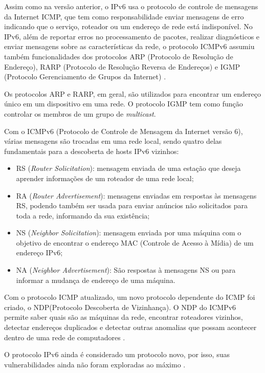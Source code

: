 Assim como na versão anterior, o IPv6 usa o protocolo de controle de mensagens da Internet ICMP, que tem como responsabilidade enviar mensagens de erro indicando que o serviço, roteador ou um endereço de rede está indisponível. No IPv6, além de reportar erros no processamento de pacotes, realizar diagnósticos e enviar mensagens sobre as características da rede, o protocolo ICMPv6 assumiu também funcionalidades dos protocolos ARP (Protocolo de Resolução de Endereço), RARP (Protocolo de Resolução Reversa de Endereços) e IGMP (Protocolo Gerenciamento de Grupos da Internet) \cite{teleco}. 

Os protocolos ARP e RARP, em geral, são utilizados para encontrar um endereço único em um dispositivo em uma rede. O protocolo IGMP tem como função controlar os membros de um grupo de \textit{multicast}.

Com o ICMPv6 (Protocolo de Controle de Mensagem da Internet versão 6), várias mensagens são trocadas em uma rede local, sendo quatro delas fundamentais para a descoberta de hosts IPv6 vizinhos:

\begin{itemize}
\item RS (\textit{Router Solicitation}): mensagem enviada de uma estação que deseja aprender informações de um roteador de uma rede local;
\item RA (\textit{Router Advertisement}): mensagens enviadas em respostas às mensagens RS, podendo também ser usada para enviar anúncios não solicitados para toda a rede, informando da sua existência;
\item NS (\textit{Neighbor Solicitation}): mensagem enviada por uma máquina com o objetivo de encontrar o endereço MAC (Controle de Acesso à Mídia) de um endereço IPv6;
\item NA (\textit{Neighbor Advertisement}): São respostas à mensagens NS ou para informar a mudança de endereço de uma máquina.
\end{itemize}

Com o protocolo ICMP atualizado, um novo protocolo dependente do ICMP foi criado, o NDP(Protocolo Descoberta de Vizinhança). O NDP do ICMPv6 permite saber quais são as máquinas da rede, encontrar roteadores vizinhos, detectar endereços duplicados e detectar outras anomalias que possam acontecer dentro de uma rede de computadores \cite{rfc4861}.

O protocolo IPv6 ainda é considerado um protocolo novo, por isso, suas vulnerabilidades ainda não foram exploradas ao máximo \cite{internet-of-things}. 

